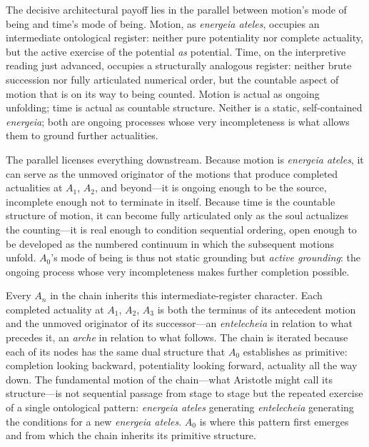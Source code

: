 The decisive architectural payoff lies in the parallel between motion's mode of being and time's mode of being. Motion, as \textit{energeia ateles}, occupies an intermediate ontological register: neither pure potentiality nor complete actuality, but the active exercise of the potential \textit{as} potential. Time, on the interpretive reading just advanced, occupies a structurally analogous register: neither brute succession nor fully articulated numerical order, but the countable aspect of motion that is on its way to being counted. Motion is actual as ongoing unfolding; time is actual as countable structure. Neither is a static, self-contained \textit{energeia}; both are ongoing processes whose very incompleteness is what allows them to ground further actualities.

The parallel licenses everything downstream. Because motion is \textit{energeia ateles}, it can serve as the unmoved originator of the motions that produce completed actualities at $A_1$, $A_2$, and beyond---it is ongoing enough to be the source, incomplete enough not to terminate in itself. Because time is the countable structure of motion, it can become fully articulated only as the soul actualizes the counting---it is real enough to condition sequential ordering, open enough to be developed as the numbered continuum in which the subsequent motions unfold. $A_0$'s mode of being is thus not static grounding but \textit{active grounding}: the ongoing process whose very incompleteness makes further completion possible.

Every $A_n$ in the chain inherits this intermediate-register character. Each completed actuality at $A_1$, $A_2$, $A_3$ is both the terminus of its antecedent motion and the unmoved originator of its successor---an \textit{entelecheia} in relation to what precedes it, an \textit{arche} in relation to what follows. The chain is iterated because each of its nodes has the same dual structure that $A_0$ establishes as primitive: completion looking backward, potentiality looking forward, actuality all the way down. The fundamental motion of the chain---what Aristotle might call its  structure---is not sequential passage from stage to stage but the repeated exercise of a single ontological pattern: \textit{energeia ateles} generating \textit{entelecheia} generating the conditions for a new \textit{energeia ateles}. $A_0$ is where this pattern first emerges and from which the chain inherits its primitive structure.

